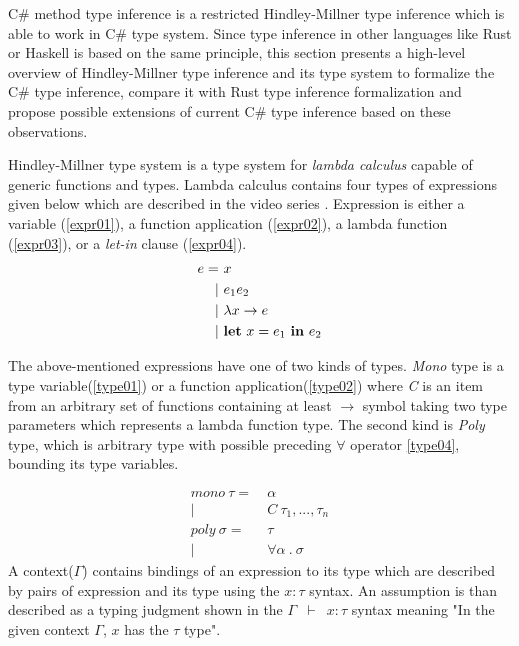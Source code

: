 C\# method type inference is a restricted Hindley-Millner type inference which is able to work in C\# type system.
Since type inference in other languages like Rust or Haskell is based on the same principle, this section presents a high-level overview of Hindley-Millner type inference and its type system to formalize the C\# type inference, compare it with Rust type inference formalization and propose possible extensions of current C\# type inference based on these observations.
\par
Hindley-Millner type system \cite{online:wikiHM} is a type system for \textit{lambda calculus} capable of generic functions and types.
Lambda calculus contains four types of expressions given below which are described in the video series \cite{online:HMVideos}.
Expression is either a variable (\ref{expr01}), a function application (\ref{expr02}), a lambda function (\ref{expr03}), or a \textit{let-in} clause (\ref{expr04}).
\begin{align}
e =&\ x\label{expr01}\\
|&\ e_1 e_2\label{expr02}\\
|&\ \lambda x \rightarrow e\label{expr03}\\
|&\ \text{\textbf{let}}\ x = e_1\ \text{\textbf{in}}\ e_2\label{expr04} 
\end{align}
\par
The above-mentioned expressions have one of two kinds of types.
\textit{Mono} type is a type variable(\ref{type01}) or a function application(\ref{type02}) where \textit{C} is an item from an arbitrary set of functions containing at least \texttt{$\rightarrow$} symbol taking two type parameters which represents a lambda function type.
The second kind is \textit{Poly} type, which is arbitrary type with possible preceding $\forall$ operator \ref{type04}, bounding its type variables.
\par
\begin{align}
mono\ \tau =&\ \alpha\label{type01}\\
|&\ C\ \tau_1,...,\tau_n\label{type02}\\
poly\ \sigma =&\ \tau\label{type03}\\
|&\ \forall \alpha\ .\ \sigma\label{type04}
\end{align}
A context(\texttt{$\Gamma$}) contains bindings of an expression to its type which are described by pairs of expression and its type using the \texttt{$x:\tau$} syntax.
An assumption is than described as a typing judgment shown in the \texttt{$\Gamma$ $\vdash$ $x:\tau$} syntax meaning "In the given context \texttt{$\Gamma$}, \texttt{$x$} has the \texttt{$\tau$} type".
